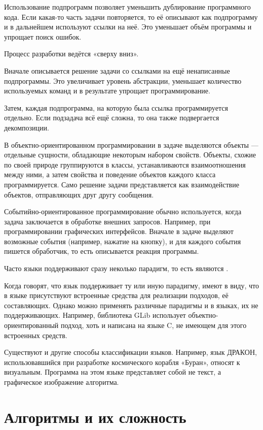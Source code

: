 Использование подпрограмм позволяет уменьшить дублирование
программного кода. Если какая-то часть задачи повторяется, то её
описывают как подпрограмму и в дальнейшем используют ссылки на
неё. Это уменьшает объём программы и упрощает поиск ошибок.

Процесс разработки ведётся «сверху вниз».

Вначале описывается решение задачи со ссылками на ещё ненаписанные
подпрограммы. Это увеличивает уровень абстракции, уменьшает количество
используемых команд и в результате упрощает программирование.

Затем, каждая подпрограмма, на которую была ссылка программируется
отдельно. Если подзадача всё ещё сложна, то она также подвергается
декомпозиции.

В объектно-ориентированном программировании в задаче выделяются
объекты — отдельные сущности, обладающие некоторым набором
свойств. Объекты, схожие по своей природе группируются в классы,
устанавливаются взаимоотношения между ними, а затем свойства и
поведение объектов каждого класса программируется.  Само решение
задачи представляется как взаимодействие объектов, отправляющих друг
другу сообщения.

Событийно-ориентированное программирование обычно используется, когда
задача заключается в обработке внешних запросов. Например, при
программировании графических интерфейсов. Вначале в задаче выделяют
возможные события (например, нажатие на кнопку), и для каждого события
пишется обработчик, то есть описывается реакция программы.

Часто языки поддерживают сразу неколько парадигм, то есть являются
.

Когда говорят, что язык поддерживает ту или иную парадигму, имеют в
виду, что в языке присутствуют встроенные средства для реализации
подходов, её составляющих. Однако можно применять различные парадигмы
и в языках, их не поддерживающих. Например, библиотека GLib использует
объектно-ориентированный подход, хоть и написана на языке C, не
имеющем для этого встроенных средств.

Существуют и другие способы классификации языков. Например, язык
ДРАКОН, использовавшийся при разработке космического корабля «Буран»,
относят к визуальным. Программа на этом языке представляет собой не
текст, а графическое изображение алгоритма.

\section{Алгоритмы и их сложность}

